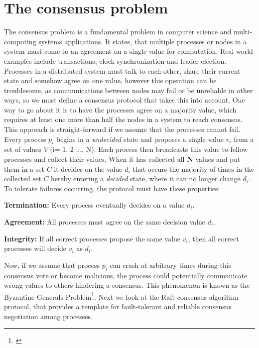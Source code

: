 \section{The consensus problem}

The consensus problem is a fundamental problem in computer science and multi-computing systems applications. It states, that multiple processes or nodes in a system must come to an agreement on a single value for computation. Real world examples include transactions, clock synchronization and leader-election. Processes in a distributed system must talk to each-other, share their current state and somehow agree on one value, however this operation can be troublesome, as communications between nodes may fail or be unreliable in other ways, so we must define a consensus protocol that takes this into account. One way to go about it is to have the processes agree on a majority value, which requires at least one more than half the nodes in a system to reach consensus. This approach is straight-forward if we assume that the processes cannot fail. Every process $p_i$ begins in a \textit{undecided} state and proposes a single value $v_i$ from a set of values $V$ (i= 1, 2 ..., N). Each process then broadcasts this value to fellow processes and collect their values. When it has collected all \textbf{N} values and put them in a set $C$ it decides on the value $d_i$ that occurs the majority of times in the collected set $C$ hereby entering a \textit{decided} state, where it can no longer change $d_i$. To tolerate failures occurring, the protocol must have these properties:

\noindent \textbf{Termination:} Every process eventually decides on a value $d_i$.

\noindent \textbf{Agreement:} All processes must agree on the same decision value $d_i$.

\noindent \textbf{Integrity:} If all correct processes propose the same value $v_i$, then all correct processes will decide $v_i$ as $d_i$.

\noindent Now, if we assume that process $p_i$ can crash at arbitrary times during this consensus vote or become malicious, the process could potentially communicate wrong values to others hindering a consensus. This phenomenon is known as the Byzantine Generals Problem\footnote{\cite{Lamport1982}}. Next we look at the Raft consensus algorithm protocol, that provides a template for fault-tolerant and reliable consensus negotiation among processes.